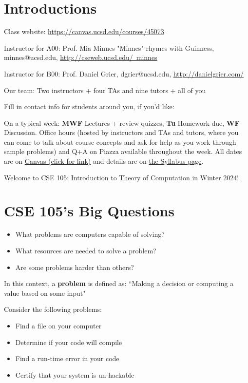 \newpage

\section*{Introductions}
Class website: \href{https://canvas.ucsd.edu/courses/45073}{https://canvas.ucsd.edu/courses/45073}


Instructor for A00: Prof. Mia Minnes {\tiny{"Minnes" rhymes with Guinness}}, minnes@ucsd.edu, 
\href{http://cseweb.ucsd.edu/~minnes}{http://cseweb.ucsd.edu/~minnes}

Instructor for B00: Prof. Daniel Grier, dgrier@ucsd.edu, \href{http://danielgrier.com/}{http://danielgrier.com/}

Our team: Two instructors + four TAs and nine tutors + all of you

Fill in contact info for students around you, if you'd like:

\vfill


On a typical week: {\bf MWF} Lectures + review quizzes, {\bf Tu} Homework due, {\bf WF} Discussion.
Office hours (hosted by instructors and TAs and tutors, where you can come to talk 
about course concepts and ask for help as you work through sample problems) and Q+A on Piazza available throughout the week.
All dates are on \href{https://canvas.ucsd.edu/}{Canvas (click for link)} and details are on
 \href{https://canvas.ucsd.edu/courses/45073}{the Syllabus page}.

\newpage Welcome to CSE 105: Introduction to Theory of Computation in Winter 2024!

\section*{CSE 105's Big Questions}
\begin{itemize}
   \item What problems are computers capable of solving?
   \item What resources are needed to solve a problem?
   \item Are some problems harder than others?
\end{itemize}

In this context, a {\bf problem} is defined as: ``Making a decision or computing a value based on some input"

Consider the following problems: 
\begin{itemize}
   \item Find a file on your computer
   \item Determine if your code will compile
   \item Find a run-time error in your code
   \item Certify that your system is un-hackable
\end{itemize}

